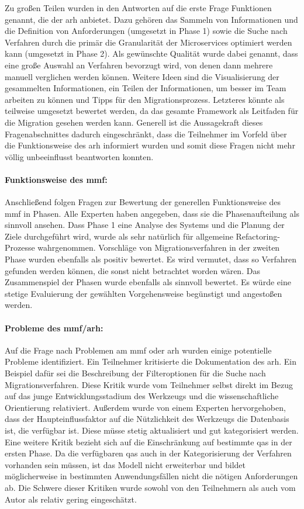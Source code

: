 Zu großen Teilen wurden in den Antworten auf die erste Frage Funktionen genannt, die der \gls{arh} anbietet.
Dazu gehören das Sammeln von Informationen und die Definition von Anforderungen (umgesetzt in Phase 1)  sowie die Suche nach Verfahren durch die primär die Granularität der Microservices optimiert werden kann (umgesetzt in Phase 2).
Als gewünschte Qualität wurde dabei genannt, dass eine große Auswahl an Verfahren bevorzugt wird, von denen dann mehrere manuell verglichen werden können.
Weitere Ideen sind die Visualisierung der gesammelten Informationen, ein Teilen der Informationen, um besser im Team arbeiten zu können und Tipps für den Migrationsprozess.
Letzteres könnte als teilweise umgesetzt bewertet werden, da das gesamte Framework als Leitfaden für die Migration gesehen werden kann.
Generell ist die Aussagekraft dieses Fragenabschnittes dadurch eingeschränkt, dass die Teilnehmer im Vorfeld über die Funktionsweise des \gls{arh} informiert wurden und somit diese Fragen nicht mehr völlig unbeeinflusst beantworten konnten.

\paragraph{Funktionsweise des \gls{mmf}:} Anschließend folgen Fragen zur Bewertung der generellen Funk\-ti\-ons\-wei\-se des \gls{mmf} in Phasen.
Alle Experten haben angegeben, dass sie die Phasenaufteilung als sinnvoll ansehen.
Dass Phase 1 eine Analyse des Systems und die Planung der Ziele durchgeführt wird, wurde als sehr natürlich für allgemeine Refactoring-Prozesse wahrgenommen.
Vorschläge von Migrationsverfahren in der zweiten Phase wurden ebenfalls als positiv bewertet.
Es wird vermutet, dass so Verfahren gefunden werden können, die sonst nicht betrachtet worden wären.
Das Zusammenspiel der Phasen wurde ebenfalls als sinnvoll bewertet.
Es würde eine stetige Evaluierung der gewählten Vorgehensweise begünstigt und angestoßen werden.

\paragraph{Probleme des \gls{mmf}/\gls{arh}:} Auf die Frage nach Problemen am \gls{mmf} oder \gls{arh} wurden einige potentielle Probleme identifiziert.
Ein Teilnehmer kritisierte die Dokumentation des \gls{arh}.
Ein Beispiel dafür sei die Beschreibung der Filteroptionen für die Suche nach Migrationsverfahren.
Diese Kritik wurde vom Teilnehmer selbst direkt im Bezug auf das junge Entwicklungsstadium des Werkzeugs und die wissenschaftliche Orientierung relativiert.
Außerdem wurde von einem Experten hervorgehoben, dass der Haupteinflussfaktor auf die Nützlichkeit des Werkzeugs die Datenbasis ist, die verfügbar ist.
Diese müsse stetig aktualisiert und gut kategorisiert werden.
Eine weitere Kritik bezieht sich auf die Einschränkung auf bestimmte \glspl{qa} in der ersten Phase.
Da die verfügbaren \glspl{qa} auch in der Kategorisierung der Verfahren vorhanden sein müssen, ist das Modell nicht erweiterbar und bildet möglicherweise in bestimmten Anwendungsfällen nicht die nötigen Anforderungen ab.
Die Schwere dieser Kritiken wurde sowohl von den Teilnehmern als auch vom Autor als relativ gering eingeschätzt.

